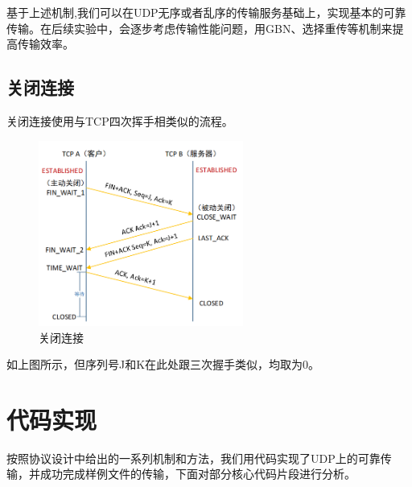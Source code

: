 \documentclass[UTF8,a4paper,10pt]{ctexart}
\begin{document}
基于上述机制,我们可以在UDP无序或者乱序的传输服务基础上，实现基本的可靠传输。在后续实验中，会逐步考虑传输性能问题，用GBN、选择重传等机制来提高传输效率。


\subsection{关闭连接}
关闭连接使用与TCP四次挥手相类似的流程。
\begin{figure}[H]
    \centering
\includegraphics[width=0.6\textwidth]{img/关闭连接.png}
    \caption{关闭连接}
\end{figure}
如上图所示，但序列号J和K在此处跟三次握手类似，均取为0。

\section{代码实现}
按照协议设计中给出的一系列机制和方法，我们用代码实现了UDP上的可靠传输，并成功完成样例文件的传输，下面对部分核心代码片段进行分析。
\end{document}

